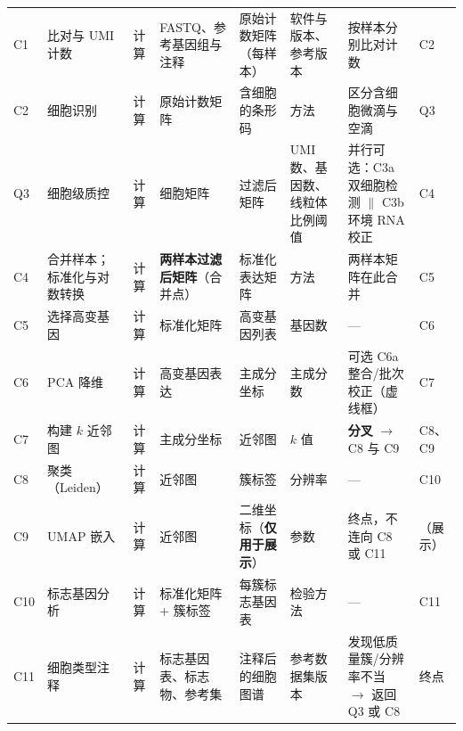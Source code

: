 \begin{table}[htbp]
\begin{tabularx}{\linewidth}{@{}l>{\raggedright\arraybackslash}p{15mm}l>{\raggedright\arraybackslash}p{16mm}>{\raggedright\arraybackslash}p{16mm}YYl@{}}
C1 & 比对与 UMI 计数 & 计算 & FASTQ、参考基因组与注释 & 原始计数矩阵（每样本） & 软件与版本、参考版本 & 按样本分别比对计数 & C2 \\
C2 & 细胞识别 & 计算 & 原始计数矩阵 & 含细胞的条形码 & 方法 & 区分含细胞微滴与空滴 & Q3 \\
Q3 & 细胞级质控 & 计算 & 细胞矩阵 & 过滤后矩阵 & UMI 数、基因数、线粒体比例阈值 & 并行可选：C3a 双细胞检测 $\parallel$ C3b 环境 RNA 校正 & C4 \\
C4 & 合并样本；标准化与对数转换 & 计算 & \textbf{两样本过滤后矩阵}（合并点） & 标准化表达矩阵 & 方法 & 两样本矩阵在此合并 & C5 \\
C5 & 选择高变基因 & 计算 & 标准化矩阵 & 高变基因列表 & 基因数 & — & C6 \\
C6 & PCA 降维 & 计算 & 高变基因表达 & 主成分坐标 & 主成分数 & 可选 C6a 整合/批次校正（虚线框） & C7 \\
C7 & 构建 $k$ 近邻图 & 计算 & 主成分坐标 & 近邻图 & $k$ 值 & \textbf{分叉} $\rightarrow$ C8 与 C9 & C8、C9 \\
C8 & 聚类（Leiden） & 计算 & 近邻图 & 簇标签 & 分辨率 & — & C10 \\
C9 & UMAP 嵌入 & 计算 & 近邻图 & 二维坐标（\textbf{仅用于展示}） & 参数 & 终点，不连向 C8 或 C11 & （展示） \\
C10 & 标志基因分析 & 计算 & 标准化矩阵 + 簇标签 & 每簇标志基因表 & 检验方法 & — & C11 \\
C11 & 细胞类型注释 & 计算 & 标志基因表、标志物、参考集 & 注释后的细胞图谱 & 参考数据集版本 & 发现低质量簇/分辨率不当 $\rightarrow$ 返回 Q3 或 C8 & 终点 \\
\bottomrule
\end{tabularx}
\end{table}

